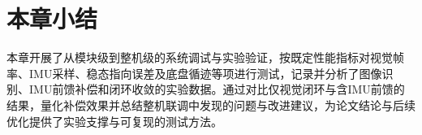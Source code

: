 



\section{本章小结}

本章开展了从模块级到整机级的系统调试与实验验证，按既定性能指标对视觉帧率、IMU采样、稳态指向误差及底盘循迹等项进行测试，记录并分析了图像识别、IMU前馈补偿和闭环收敛的实验数据。通过对比仅视觉闭环与含IMU前馈的结果，量化补偿效果并总结整机联调中发现的问题与改进建议，为论文结论与后续优化提供了实验支撑与可复现的测试方法。
